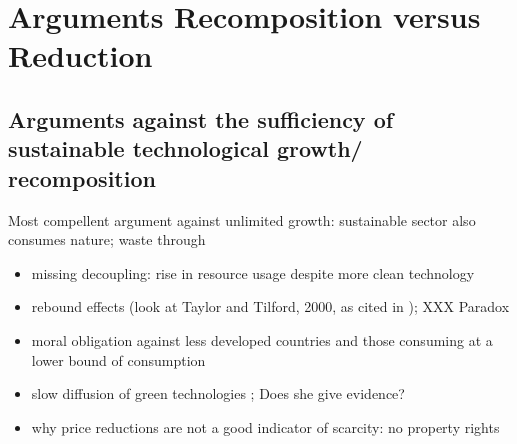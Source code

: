 \documentclass[12pt]{article}
\begin{document}
\section{Arguments Recomposition versus Reduction}
\subsection{Arguments against the sufficiency of sustainable technological growth/ recomposition}
Most compellent argument against unlimited growth: sustainable sector also consumes nature; waste through 
\begin{itemize}
\item missing decoupling: rise in resource usage despite more clean technology \citep{Alexander2012TheContext}
\item rebound effects (look at Taylor and Tilford, 2000, as cited in \cite{Schor2005SustainableReduction}); XXX Paradox \citep{Alexander2012TheContext}
\item moral obligation against less developed countries and those consuming at a lower bound of consumption \citep{Alexander2012TheContext}
\item slow diffusion of green technologies \citep{Schor2005SustainableReduction}; Does she give evidence?
\item why price reductions are not a good indicator of scarcity: no property rights \citep{Schor2005SustainableReduction}
\end{itemize}
\end{document}
